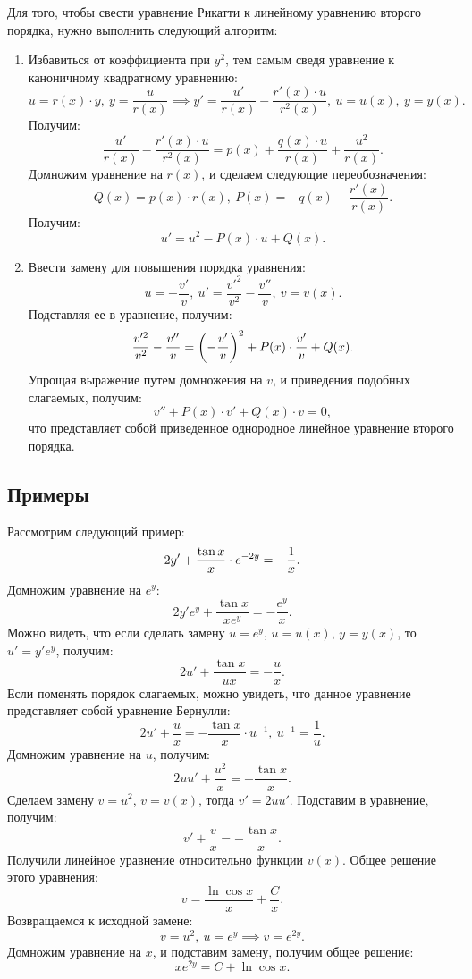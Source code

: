 	Для того, чтобы свести уравнение Рикатти к линейному уравнению второго порядка, нужно выполнить следующий алгоритм:
	\begin{enumerate}
		\item Избавиться от коэффициента при $y^2$, тем самым сведя уравнение к каноничному квадратному уравнению:
		\[ u = r(x) \cdot y, ~ y = \frac{u}{r(x)} \implies y' = \frac{u'}{r(x)} - \frac{r'(x) \cdot u}{r^2(x)}, ~ u = u(x), ~ y = y(x). \]
		Получим:
		\[ \frac{u'}{r(x)} - \frac{r'(x) \cdot u}{r^2(x)} = p(x) + \frac{q(x) \cdot u}{r(x)} + \frac{u^2}{r(x)}. \]
		Домножим уравнение на $r(x)$, и сделаем следующие переобозначения:
		\[ Q(x) = p(x) \cdot r(x), ~ P(x) = - q(x) - \frac{r'(x)}{r(x)}. \]
		Получим:
		\[ u' = u^2 - P(x) \cdot u + Q(x). \]
		\item Ввести замену для повышения порядка уравнения:
		\[ u = -\frac{v'}{v}, ~ u' = \frac{v'^2}{v^2} - \frac{v''}{v}, ~ v = v(x). \]
		Подставляя ее в уравнение, получим:
		\[ \frac{v'^2}{v^2} - \frac{v''}{v} = \left( -\frac{v'}{v} \right)^2 + P(x) \cdot \frac{v'}{v} + Q(x). \]
		Упрощая выражение путем домножения на $v$, и приведения подобных слагаемых, получим:
		\[ v'' + P(x) \cdot v' + Q(x) \cdot v = 0, \]
		что представляет собой приведенное однородное линейное уравнение второго порядка.
	\end{enumerate}

	\subsection{Примеры}

		Рассмотрим следующий пример:
		\[ 2y' + \frac{\tan{x}}{x} \cdot e^{-2y} = - \dfrac{1}{x}. \]
		Домножим уравнение на $e^{y}$:
		\[ 2y' e^{y} + \frac{\tan{x}}{x e^{y}} = - \frac{e^{y}}{x}. \]
		Можно видеть, что если сделать замену $u = e^{y}$, $u = u(x)$, $y = y(x)$, то $u' = y' e^{y}$, получим:
		\[ 2u' + \frac{\tan{x}}{ux} = - \frac{u}{x}. \]
		Если поменять порядок слагаемых, можно увидеть, что данное уравнение представляет собой уравнение Бернулли:
		\[ 2u' + \frac{u}{x} = -\frac{\tan{x}}{x} \cdot u^{-1}, ~ u^{-1} = \frac{1}{u}. \]
		Домножим уравнение на $u$, получим:
		\[ 2uu' + \frac{u^2}{x} = - \frac{\tan{x}}{x}. \]
		Сделаем замену $v = u^2$, $v = v(x)$, тогда $v' = 2uu'$. Подставим в уравнение, получим:
		\[ v' + \frac{v}{x} = - \frac{\tan{x}}{x}. \]
		Получили линейное уравнение относительно функции $v(x)$. Общее решение этого уравнения:
		\[ v = \frac{\ln{\cos{x}}}{x} + \frac{C}{x}. \]
		Возвращаемся к исходной замене:
		\[ v = u^2, ~ u = e^{y} \implies v = e^{2y}. \]
		Домножим уравнение на $x$, и подставим замену, получим общее решение:
		\[ xe^{2y} = C + \ln{\cos{x}}. \]

